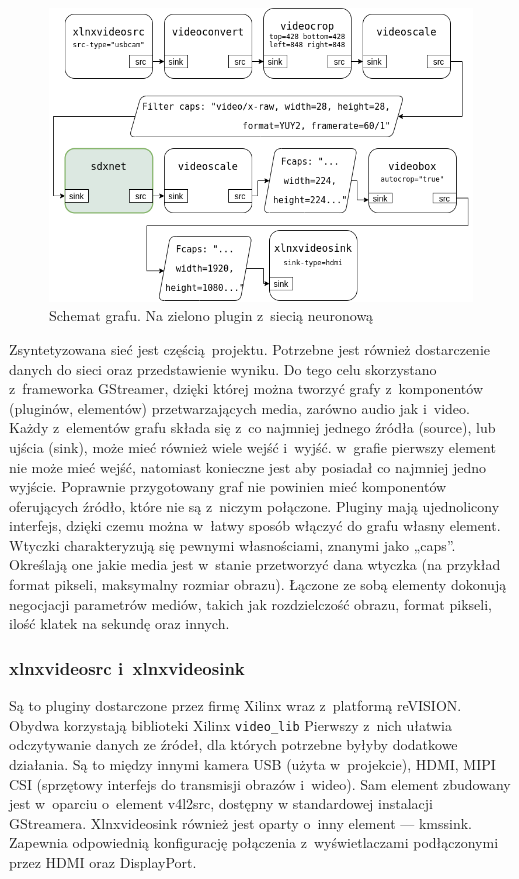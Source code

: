 \documentclass[12pt, oneside, a4paper]{article}
\begin{document}
\begin{figure}[h]
  \centering
  \includegraphics[width=\linewidth]{figures/pipeline.png}
  \caption{Schemat grafu. Na zielono plugin z~siecią neuronową}\label{fig:pipeline}
\end{figure}
Zsyntetyzowana sieć jest częścią projektu. Potrzebne jest również dostarczenie
danych do sieci oraz przedstawienie wyniku.
Do tego celu skorzystano z~frameworka GStreamer, dzięki której można
tworzyć grafy z~komponentów (pluginów, elementów)
przetwarzających media, zarówno audio jak i~video.
Każdy z~elementów grafu składa się z~co najmniej jednego źródła (source),
lub ujścia (sink), może mieć również wiele wejść i~wyjść. w~grafie pierwszy
element nie może mieć wejść, natomiast konieczne jest aby posiadał co najmniej
jedno wyjście. Poprawnie przygotowany graf nie powinien mieć komponentów
oferujących źródło, które nie są z~niczym połączone.
Pluginy mają ujednolicony interfejs, dzięki czemu można w~łatwy sposób
włączyć do grafu własny element. Wtyczki charakteryzują się
pewnymi własnościami, znanymi jako „caps”. Określają one jakie 
media jest w~stanie przetworzyć dana wtyczka (na przykład format pikseli,
maksymalny rozmiar obrazu). 
Łączone ze sobą elementy dokonują negocjacji
parametrów mediów, takich jak rozdzielczość obrazu, format pikseli,
ilość klatek na sekundę oraz innych.

\subsubsection{xlnxvideosrc i~xlnxvideosink}
Są to pluginy dostarczone przez firmę Xilinx wraz z~platformą reVISION.
Obydwa korzystają biblioteki Xilinx \lstinline{video_lib}
Pierwszy z~nich ułatwia odczytywanie danych ze źródeł, dla których potrzebne
byłyby dodatkowe działania. Są to między innymi kamera USB (użyta w~projekcie),
HDMI, MIPI CSI (sprzętowy interfejs do transmisji obrazów i~wideo).
Sam element zbudowany jest w~oparciu o~element v4l2src, dostępny
w standardowej instalacji GStreamera.
Xlnxvideosink również jest oparty o~inny element --- kmssink.
Zapewnia odpowiednią konfigurację połączenia z~wyświetlaczami
podłączonymi przez HDMI oraz DisplayPort.
\end{document}
